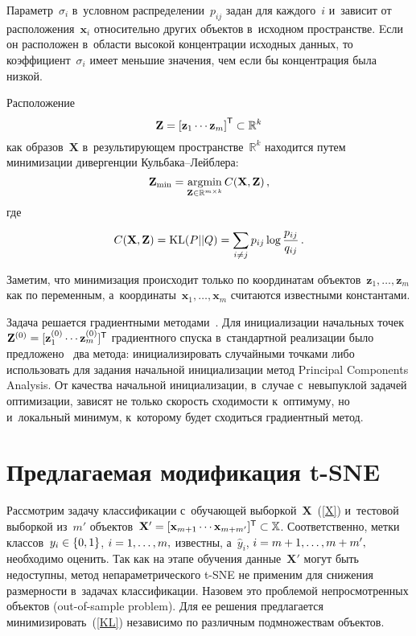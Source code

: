 \begin{multicols}{2}
Параметр~$\sigma_i$ в~условном распределении~$p_{ij}$ задан для 
каждого~$i$ и~зависит от расположения~$\mathbf{x}_i$ относительно других 
объектов в~исходном пространстве. Eсли он расположен в~области высокой 
концентрации исходных данных, то коэффициент~$\sigma_i$ имеет 
меньшие значения, чем если бы концентрация была низкой.

Расположение 
\begin{equation}
\label{Z} 
\mathbf Z = \left[\mathbf z_{1}\cdots\mathbf z_{m}\right]^{{\sf T}} \subset 
\mathbb {R}^{k}
\end{equation} 
как образов~$\mathbf{X}$ в~результирующем пространстве~$\mathbb R^k$ 
находится путем минимизации дивергенции Куль\-ба\-ка--Лейб\-ле\-ра:
\begin{equation}
\label{argmin}
{\mathbf Z_{\min} = 
\operatornamewithlimits{argmin}\limits_{\mathbf Z \in \mathbb {R}^{m\times k}}
C(\mathbf X, \mathbf Z)}\,,
\end{equation}
где
\begin{equation}
\label{KL}
C(\mathbf X, \mathbf Z) = \text{KL}(P||Q) = 
\sum\limits_{i \neq j} p_{ij} \log \displaystyle\frac{\displaystyle p_{ij}\mathstrut}{\displaystyle q_{ij}\mathstrut}\,.
\end{equation}

Заметим, что минимизация происходит только по координатам 
объектов~$\mathbf z_{1}, \dots ,\mathbf z_{m}$ как по переменным, 
а~координаты~$\mathbf x_{1}, \dots , \mathbf x_{m}$ считаются известными константами.

Задача решается градиентными методами~\cite{maaten2008visualizing}. 
Для инициализации начальных точек~$\mathbf{Z}^{(0)} \hm= [\mathbf z_1^{(0)} \cdots 
\mathbf z_m^{(0)}]^{\TSF}$ градиентного спуска в~стандартной реализации было
 предложено~\cite{maaten2008visualizing} два метода: инициализировать 
 случайными точками либо использовать для задания начальной инициализации 
 метод Principal Components Analysis. От качества начальной 
 инициализации, в~случае с~невыпуклой задачей оптимизации, зависят не 
 только ско\-рость сходимости к~оптимуму, но и~локальный минимум, к~которому 
 будет сходиться градиентный метод.

\section{Предлагаемая модификация t-SNE}

Рассмотрим задачу классификации с~обуча\-ющей выборкой~$\mathbf{X}$~(\ref{X}) и~тестовой 
выборкой из~$m'$ объектов~$\mathbf{X}'\hm= [\mathbf x_{m+1}\cdots\mathbf x_{m+m'}]^{\TSF} 
\hm\subset \mathbb X$. Соответственно, метки классов~$y_i \hm\in \{0,1\}$, 
$i \hm= 1, \ldots, m,$ известны, а~$\hat y_i$, $i\hm = m\hm+1, \ldots, m\hm+m',$ 
необходимо оценить. Так как на этапе обучения данные~$\mathbf{X}'$ могут быть
 недоступны, метод непараметрического t-SNE не применим для снижения размерности 
 в~задачах классификации. Назовем это проблемой непросмотренных объектов 
 (out-of-sample problem). Для ее решения предлагается минимизировать~(\ref{KL}) 
 независимо по различным подмножествам объектов.
 



\end{multicols}
